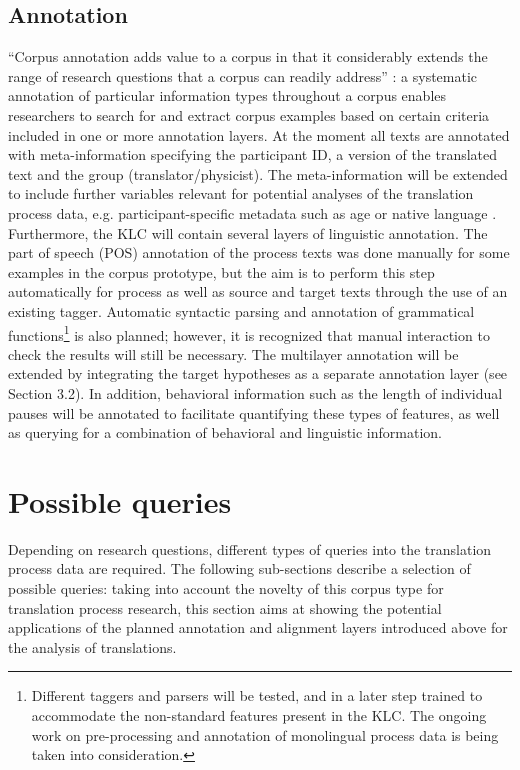 \documentclass[output=paper]{LSP/langsci}
\begin{document}
\subsection{Annotation}
“Corpus annotation adds value to a corpus in that it considerably extends the range of research questions that a corpus can readily address” \citep[29]{McEnery2006}: a systematic annotation of particular information types throughout a corpus enables researchers to search for and extract corpus examples based on certain criteria included in one or more annotation layers. At the moment all texts are annotated with meta-information specifying the participant ID, a version of the translated text and the group (translator/physicist). The meta-information will be extended to include further variables relevant for potential analyses of the translation process data, e.g. participant-specific metadata such as age or native language \citep[see][]{Hvelplund2012}. Furthermore, the KLC will contain several layers of linguistic annotation. The part of speech (POS) annotation of the process texts was done manually for some examples in the corpus prototype, but the aim is to perform this step automatically for process as well as source and target texts through the use of an existing tagger. Automatic syntactic parsing and annotation of grammatical functions\footnote{Different taggers and parsers will be tested, and in a later step trained to accommodate the non-standard features present in the KLC. The ongoing work on pre-processing and annotation of monolingual process data \citep{Leijten2012,Macken2012} is being taken into consideration.} is also planned; however, it is recognized that manual interaction to check the results will still be necessary. The multilayer annotation \citep[see][]{Hansen-Schirra2006} will be extended by integrating the target hypotheses as a separate annotation layer (see Section 3.2). In addition, behavioral information such as the length of individual pauses \citep[see][]{Alves2009,Alves2011} will be annotated to facilitate quantifying these types of features, as well as querying for a combination of behavioral and linguistic information.

\section{Possible queries}
Depending on research questions, different types of queries into the translation process data are required. The following sub-sections describe a selection of possible queries: taking into account the novelty of this corpus type for translation process research, this section aims at showing the potential applications of the planned annotation and alignment layers introduced above for the analysis of translations.
\end{document}
